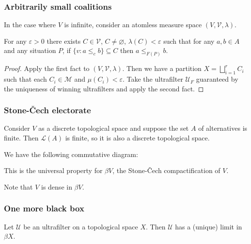 \documentclass{beamer}
\theoremstyle{definition}
\begin{document}
\begin{frame}
    \frametitle{Arbitrarily small coalitions}

    In the case where $V$ is infinite, consider an atomless measure space $(V, \mathcal{V}, \lambda)$.

    \pause
    \begin{theorem}
        For any $\varepsilon > 0$ there exists $C \in \mathcal{V}$, $C \neq \varnothing$, $\lambda(C) < \varepsilon$ such that for any $a, b \in A$
        and any situation $P$, if $\{v : a \leq_c b\} \subseteq C$ then $a \leq_{F(P)} b$.
    \end{theorem}

    \pause
    \begin{proof}
        Apply the first fact to $(V, \mathcal{V}, \lambda)$. Then we have a partition $X = \bigsqcup_{i=1}^r C_i$ such that each $C_i \in \mathcal{M}$
        and $\mu(C_i) < \varepsilon$. Take the ultrafilter $\mathcal{U}_F$ guaranteed by the uniqueness of winning ultrafilters and apply the second fact.
    \end{proof}

\end{frame}

\begin{frame}
    \frametitle{Stone-\v{C}ech electorate}

    Consider $V$ as a discrete topological space and suppose the set $A$ of alternatives is finite. Then $\mathcal{L}(A)$ is finite, so it is also
    a discrete topological space.

    \pause
    We have the following commutative diagram:
    \begin{center}
    \end{center}
    \pause
    This is the universal property for $\mathit{\beta V}$, the Stone-\v{C}ech compactification of $V$.

    \pause
    Note that $V$ is dense in $\mathit{\beta V}$.

\end{frame}

\begin{frame}
    \frametitle{One more black box}

    \begin{fact}
        Let $\mathcal{U}$ be an ultrafilter on a topological space $X$. Then $\mathcal{U}$ has a (unique) limit in $\mathit{\beta X}$.
    \end{fact}

\end{frame}
\end{document}
